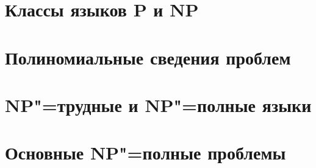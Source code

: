 \documentclass{Exams}
\begin{document}
\section{Классы языков P и NP}


\section{Полиномиальные сведения проблем}


\section{NP"=трудные и NP"=полные языки}


\section{Основные NP"=полные проблемы}
\end{document}

